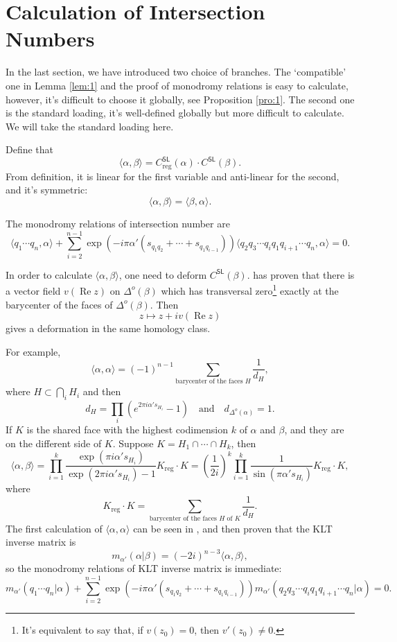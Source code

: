 \documentclass[11pt]{article}
\theoremstyle{definition}
\theoremstyle{plain}
\begin{document}
\section{Calculation of Intersection Numbers}

In the last section, we have introduced two choice of branches.
The `compatible' one in Lemma \ref{lem:1} and the proof of monodromy
relations is easy to calculate, however, it's difficult to choose 
it globally, see Proposition \ref{pro:1}. The second one is 
the standard loading, it's well-defined globally but more difficult
to calculate. We will take the standard loading here.

Define that
\[
	\langle \alpha,\beta\rangle= 
	C_{\text{reg}}^{\mathsf{SL}}(\alpha)\cdot C^{\mathsf{SL}}(\beta).
\]
From definition, it is linear for the first variable and 
anti-linear for the second, and it's symmetric:
\[
	\langle \alpha,\beta\rangle=\langle \beta,\alpha\rangle.
\]

The monodromy relations of intersection number are
\[
	\langle q_1\cdots q_n,\alpha\rangle +
	\sum_{i=2}^{n-1}\exp(-i\pi\alpha' 
	(s_{q_1q_2}+\cdots+s_{q_1q_{i-1}}))
	\langle q_2q_3\cdots q_i q_1 q_{i+1}\cdots q_n,\alpha\rangle =0.
\]

In order to calculate $\langle \alpha,\beta \rangle$, one need to
deform $C^{\mathsf{SL}}(\beta)$. \cite{dijkgraaf1988c} has proven that
there is a vector field $v(\operatorname{Re} z)$ on $\Delta^o(\beta)$ 
which has transversal zero\footnote{
It's equivalent to say that, if $v(z_0)=0$, then $v'(z_0)\neq 0$.}
exactly at the barycenter of the faces of $\Delta^o(\beta)$. Then
\[
	z\mapsto z+iv(\operatorname{Re} z)
\]
gives a deformation in the same homology class. 

For example,
\[
	\langle \alpha,\alpha \rangle=(-1)^{n-1}\sum_{\text{barycenter of the faces $H$}}
	\frac{1}{d_H},
\]
where $H\subset \bigcap_i H_{i}$ and then
\[
	d_H=\prod_i \left(e^{2\pi i \alpha' s_{H_i}}-1\right) \quad
	\text{and} \quad d_{\Delta^o(\alpha)}=1.
\]
If $K$ is the shared face with the highest codimension $k$
of $\alpha$ and $\beta$, and they are on the different 
side of $K$. Suppose $K=H_1\cap \cdots \cap H_k$, then
\[
	\langle \alpha,\beta\rangle
	=\prod_{i=1}^k \frac{\exp(\pi i\alpha' s_{H_i})}{\exp(2\pi i \alpha' s_{H_i})-1}K_{\text{reg}}\cdot K
	=\left(\frac{1}{2i}\right)^k\prod_{i=1}^k\frac{1}{\sin(\pi \alpha' s_{H_i})}K_{\text{reg}}\cdot K,
\]
where
\[
	K_{\text{reg}}\cdot K=\sum_{\text{barycenter of the faces $H$ of $K$}}
	\frac{1}{d_H}.
\]
The first calculation of $\langle \alpha,\alpha\rangle$ 
can be seen in \cite{mimachi2003intersection}, and then
\cite{mizera2017combinatorics} proven that the KLT inverse matrix is
\[
	m_{\alpha'}(\alpha|\beta)=\left(-2i\right)^{n-3}\langle
	\alpha,\beta\rangle,
\]
so the monodromy relations of KLT inverse matrix is immediate:
\[
	m_{\alpha'}(q_1\cdots q_n|\alpha)+
	\sum_{i=2}^{n-1}\exp(-i\pi\alpha' 
	(s_{q_1q_2}+\cdots+s_{q_1q_{i-1}}))
	m_{\alpha'}(q_2q_3\cdots q_i q_1 q_{i+1}\cdots q_n|\alpha)=0.
\]
\end{document}
